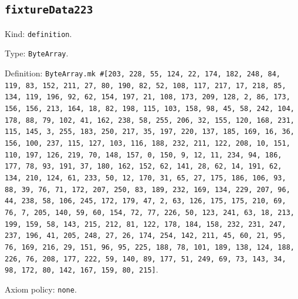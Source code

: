 \documentclass[11pt]{article}
\begin{document}
\subsection*{\texttt{fixtureData223}}
\noindent Kind: \texttt{definition}.\par
\noindent Type: \texttt{ByteArray}.\par
\noindent Definition: \texttt{ByteArray.mk \#[203, 228, 55, 124, 22, 174, 182, 248, 84, 119, 83, 152, 211, 27, 80, 190, 82, 52, 108, 117, 217, 17, 218, 85, 134, 119, 196, 92, 62, 154, 197, 21, 108, 173, 209, 128, 2, 86, 173, 156, 156, 213, 164, 18, 82, 198, 115, 103, 158, 98, 45, 58, 242, 104, 178, 88, 79, 102, 41, 162, 238, 58, 255, 206, 32, 155, 120, 168, 231, 115, 145, 3, 255, 183, 250, 217, 35, 197, 220, 137, 185, 169, 16, 36, 156, 100, 237, 115, 127, 103, 116, 188, 232, 211, 122, 208, 10, 151, 110, 197, 126, 219, 70, 148, 157, 0, 150, 9, 12, 11, 234, 94, 186, 177, 78, 93, 191, 37, 180, 162, 152, 62, 141, 28, 62, 14, 191, 62, 134, 210, 124, 61, 233, 50, 12, 170, 31, 65, 27, 175, 186, 106, 93, 88, 39, 76, 71, 172, 207, 250, 83, 189, 232, 169, 134, 229, 207, 96, 44, 238, 58, 106, 245, 172, 179, 47, 2, 63, 126, 175, 175, 210, 69, 76, 7, 205, 140, 59, 60, 154, 72, 77, 226, 50, 123, 241, 63, 18, 213, 199, 159, 58, 143, 215, 212, 81, 122, 178, 184, 158, 232, 231, 247, 237, 196, 41, 205, 248, 27, 26, 174, 254, 142, 211, 45, 60, 21, 95, 76, 169, 216, 29, 151, 96, 95, 225, 188, 78, 101, 189, 138, 124, 188, 226, 76, 208, 177, 222, 59, 140, 89, 177, 51, 249, 69, 73, 143, 34, 98, 172, 80, 142, 167, 159, 80, 215]}.\par
\noindent Axiom policy: \texttt{none}.\par
\end{document}
